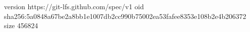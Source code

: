 version https://git-lfs.github.com/spec/v1
oid sha256:5a0848a67be2a8bb1e1007db2cc990b75002ea53fafee8353e108b2e4b206372
size 456824
